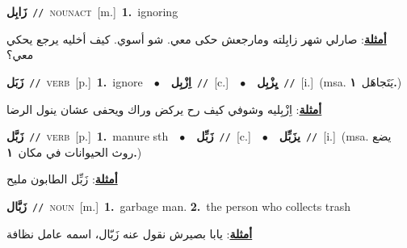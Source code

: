 \documentclass[10pt,a4paper,twoside]{article} %
\begin{document}
\begin{multicols}{2}
{\setlength\topsep{0pt}\textbf{\foreignlanguage{arabic}{زَابِل}}\ {\color{gray}\texttt{//}\color{black}}\ \textsc{noun\textunderscore act}\ [m.]\ \textbf{1.}~ignoring\  \begin{flushright}\color{gray}\foreignlanguage{arabic}{\textbf{\underline{\foreignlanguage{arabic}{أمثلة}}}: صارلي شهر زابِلته ومارجعش حكى معي. شو أسوي. كيف أخليه يرجع يحكي معي؟}\end{flushright}\color{black}} \vspace{2mm}

{\setlength\topsep{0pt}\textbf{\foreignlanguage{arabic}{زَبَل}}\ {\color{gray}\texttt{//}\color{black}}\ \textsc{verb}\ [p.]\ \textbf{1.}~ignore\ \ $\bullet$\ \ \setlength\topsep{0pt}\textbf{\foreignlanguage{arabic}{اِزْبِل}}\ {\color{gray}\texttt{//}\color{black}}\ [c.]\ \ $\bullet$\ \ \setlength\topsep{0pt}\textbf{\foreignlanguage{arabic}{يِزْبِل}}\ {\color{gray}\texttt{//}\color{black}}\ [i.]\ \color{gray}(msa. \foreignlanguage{arabic}{يَتَجاهَل}~\foreignlanguage{arabic}{\textbf{١.}})\color{black}\  \begin{flushright}\color{gray}\foreignlanguage{arabic}{\textbf{\underline{\foreignlanguage{arabic}{أمثلة}}}: اِزْبِليه وشوفي كيف رح يركض وراك ويحفى عشان ينول الرضا}\end{flushright}\color{black}} \vspace{2mm}

{\setlength\topsep{0pt}\textbf{\foreignlanguage{arabic}{زَبَّل}}\ {\color{gray}\texttt{//}\color{black}}\ \textsc{verb}\ [p.]\ \textbf{1.}~manure sth\ \ $\bullet$\ \ \setlength\topsep{0pt}\textbf{\foreignlanguage{arabic}{زَبِّل}}\ {\color{gray}\texttt{//}\color{black}}\ [c.]\ \ $\bullet$\ \ \setlength\topsep{0pt}\textbf{\foreignlanguage{arabic}{يزَبِّل}}\ {\color{gray}\texttt{//}\color{black}}\ [i.]\ \color{gray}(msa. \foreignlanguage{arabic}{يضع روث الحيوانات في مكان}~\foreignlanguage{arabic}{\textbf{١.}})\color{black}\  \begin{flushright}\color{gray}\foreignlanguage{arabic}{\textbf{\underline{\foreignlanguage{arabic}{أمثلة}}}: زَبِّل الطابون مليح}\end{flushright}\color{black}} \vspace{2mm}

{\setlength\topsep{0pt}\textbf{\foreignlanguage{arabic}{زَبَّال}}\ {\color{gray}\texttt{//}\color{black}}\ \textsc{noun}\ [m.]\ \textbf{1.}~garbage man.  \textbf{2.}~the person who collects trash\  \begin{flushright}\color{gray}\foreignlanguage{arabic}{\textbf{\underline{\foreignlanguage{arabic}{أمثلة}}}: يابا بصيرش نقول عنه زَبّال، اسمه عامل نظافة}\end{flushright}\color{black}} \vspace{2mm}


\end{multicols}
\end{document}

